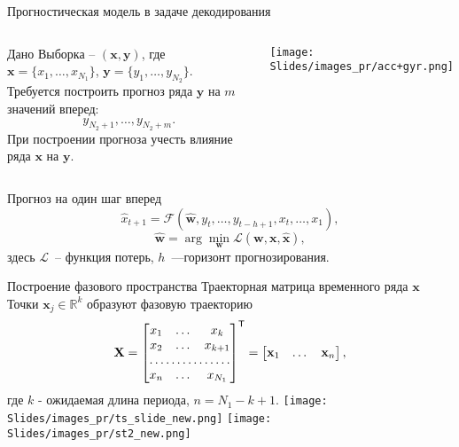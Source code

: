 \documentclass[9pt]{beamer}
\newcommand{\bx}{\mathbf{x}}
\newcommand{\by}{\mathbf{y}}
\newcommand{\bw}{\mathbf{w}}
\begin{document}
\begin{frame}{Прогностическая модель в задаче декодирования}
\begin{columns}
\begin{block}{Дано}
	\vspace{0.1cm}
	Выборка -- $\left( \bx, \by \right)$,\; где \quad
	$\bx = \{ x_1,\dots, x_{N_1}\}$,\quad
	$\by = \{ y_1,\dots, y_{N_2}\}$.\\
	\vspace{0.3cm}
	Требуется построить прогноз ряда $\by$ на $m$ значений вперед:   \[y_{N_2 + 1},\dots, y_{N_2 + m}.\]
	При построении прогноза учесть влияние ряда $\bx$ на $\by$.
	\end{block}
\vspace{0.3cm}
\texttt{[image: Slides/images\_pr/acc+gyr.png]}
\end{columns} 
\vspace{-0.2cm}
\begin{block}{Прогноз на один шаг вперед}
    \vspace{-0.1cm}
	\[
		\hat{x}_{t+1} = \mathcal{F}(\hat{\bw}, y_t,\dots,y_{t-h+1}, x_t,\dots,x_1),
	\]
	\[
	    \hat{\bw} = \arg\min_{\bw} \mathcal{L}(\bw, \bx, \hat{\bx}),
	\]
	здесь $\mathcal{L}$~-- функция потерь, $h$~---горизонт прогнозирования.
\end{block}	
	

	
\end{frame}
\begin{frame}{Построение фазового пространства}
\vspace{0.3cm}
Траекторная матрица временного ряда $\bx$\\
Точки $\bx_j\in\mathbb{R}^k$\; образуют фазовую траекторию
\vspace{0.2cm}
        \[ \mbox{\bfseries X} = \begin{bmatrix}
                        x_1 & \dots & x_k \\
                        x_2 & \dots & x_{k+1} \\
                        \hdotsfor{3} \\
                        x_{n} & \dots & x_{N_1}
                        \end{bmatrix}^{\mathsf{T}} = \begin{bmatrix} \bx_1 & \dots & \bx_{n} \end{bmatrix},\]
\vspace{0.1cm}
где $k$ - ожидаемая длина периода, $n = N_1 - k + 1$.                        
\hfil\hfil\texttt{[image: Slides/images\_pr/ts\_slide\_new.png]}
\hfil\hfil\texttt{[image: Slides/images\_pr/st2\_new.png]}


\end{frame}
\end{document}
